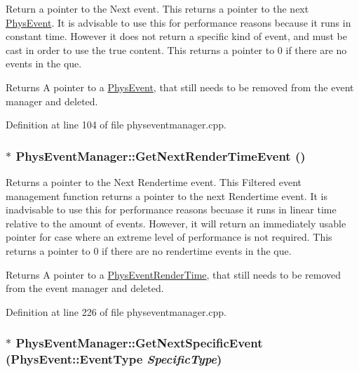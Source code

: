 Return a pointer to the Next event. This returns a pointer to the next \hyperlink{classPhysEvent}{PhysEvent}. It is advisable to use this for performance reasons because it runs in constant time. However it does not return a specific kind of event, and must be cast in order to use the true content. This returns a pointer to 0 if there are no events in the que. \begin{DoxyReturn}{Returns}
A pointer to a \hyperlink{classPhysEvent}{PhysEvent}, that still needs to be removed from the event manager and deleted. 
\end{DoxyReturn}


Definition at line 104 of file physeventmanager.cpp.\hypertarget{classPhysEventManager_a1f2d0506ce816176913e5bdfaa9fd724}{
\subsubsection[{GetNextRenderTimeEvent}]{ $\ast$ PhysEventManager::GetNextRenderTimeEvent ()}}
\label{d5/dd7/classPhysEventManager_a1f2d0506ce816176913e5bdfaa9fd724}


Returns a pointer to the Next Rendertime event. This Filtered event management function returns a pointer to the next Rendertime event. It is inadvisable to use this for performance reasons becuase it runs in linear time relative to the amount of events. However, it will return an immediately usable pointer for case where an extreme level of performance is not required. This returns a pointer to 0 if there are no rendertime events in the que. \begin{DoxyReturn}{Returns}
A pointer to a \hyperlink{classPhysEventRenderTime}{PhysEventRenderTime}, that still needs to be removed from the event manager and deleted. 
\end{DoxyReturn}


Definition at line 226 of file physeventmanager.cpp.\hypertarget{classPhysEventManager_a56e45572c2fb84131f7d55c060c7ac21}{
\subsubsection[{GetNextSpecificEvent}]{ $\ast$ PhysEventManager::GetNextSpecificEvent (PhysEvent::EventType {\em SpecificType})}}
\label{d5/dd7/classPhysEventManager_a56e45572c2fb84131f7d55c060c7ac21}


